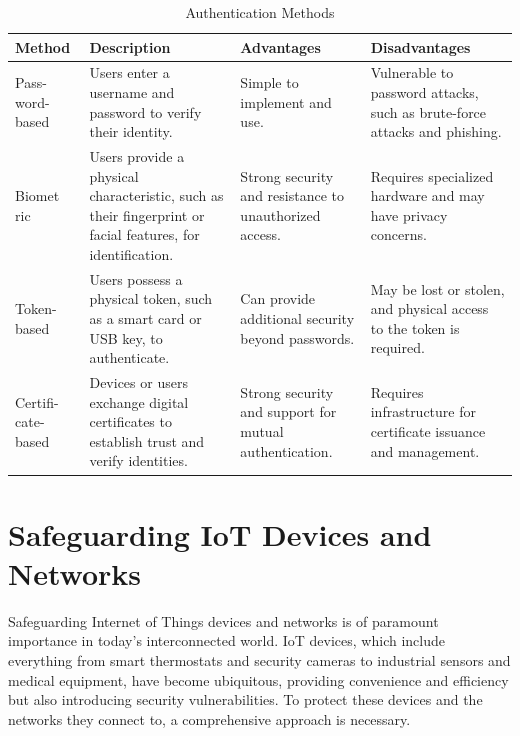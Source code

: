 \documentclass[conference]{IEEEtran}
\begin{document}
\begin{table}[h]
\centering
\small
\caption{Authentication Methods}
\begin{tabular}{|p{0.75cm}|p{2.25cm}|p{1.75cm}|p{2.25cm}|}
\hline
\textbf{Method} & \textbf{Description} & \textbf{Advantages} & \textbf{Disadvantages} \\
\hline
Pass-word-based & Users enter a username and password to verify their identity. & Simple to implement and use. & Vulnerable to password attacks, such as brute-force attacks and phishing. \\
\hline
Biomet
ric & Users provide a physical characteristic, such as their fingerprint or facial features, for identification. & Strong security and resistance to unauthorized access. & Requires specialized hardware and may have privacy concerns. \\
\hline
Token-based & Users possess a physical token, such as a smart card or USB key, to authenticate. & Can provide additional security beyond passwords. & May be lost or stolen, and physical access to the token is required. \\
\hline
Certifi-cate-based & Devices or users exchange digital certificates to establish trust and verify identities. & Strong security and support for mutual authentication. & Requires infrastructure for certificate issuance and management. \\
\hline
\end{tabular}
\end{table}





\section{Safeguarding IoT Devices and Networks}

Safeguarding Internet of Things devices and networks is of paramount importance in today's interconnected world. IoT devices, which include everything from smart thermostats and security cameras to industrial sensors and medical equipment, have become ubiquitous, providing convenience and efficiency but also introducing security vulnerabilities. To protect these devices and the networks they connect to, a comprehensive approach is necessary.
\end{document}
